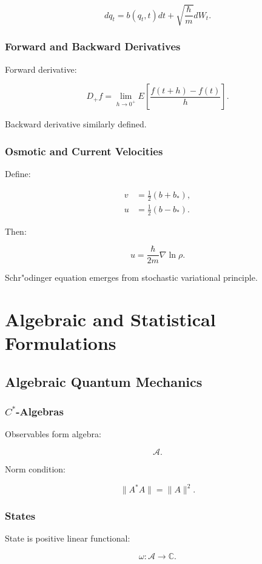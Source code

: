 \documentclass[11pt]{book}
\begin{document}
\[
dq_t
=
b(q_t,t)dt
+
\sqrt{\frac\hbar m}dW_t.
\]

\section{Forward and Backward Derivatives}

Forward derivative:

\[
D_+f
=
\lim_{h\to0^+}
E\left[
\frac{f(t+h)-f(t)}h
\right].
\]

Backward derivative similarly defined.

\section{Osmotic and Current Velocities}

Define:

\begin{align}
v &= \frac12(b+b_*),\\
u &= \frac12(b-b_*).
\end{align}

Then:

\[
u = \frac\hbar{2m}\nabla\ln\rho.
\]

Schr"odinger equation emerges from stochastic variational principle.

\part{Algebraic and Statistical Formulations}

\chapter{Algebraic Quantum Mechanics}

\section{$C^*$-Algebras}

Observables form algebra:

\[
\mathcal A.
\]

Norm condition:

\[
\|A^*A\|=\|A\|^2.
\]

\section{States}

State is positive linear functional:

\[
\omega:\mathcal A\to\mathbb C.
\]
\end{document}
